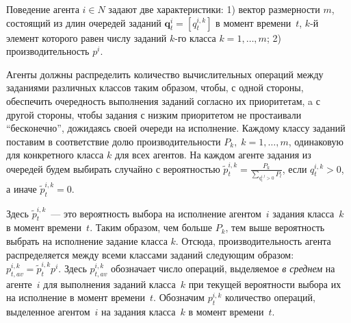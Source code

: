 \documentclass{spisok-article}
\begin{document}
Поведение агента $i \in N$ задают две характеристики:
1) вектор размерности $m$, состоящий из длин очередей заданий $\mathbf q_{t}^{i} = [q^{i, k}_t] $ в момент времени~$t$,  $k$-й элемент которого равен числу заданий $k$-го класса $k=1, \ldots, m$;
2) производительность $p^{i}$.

Агенты должны распределить количество вычислительных операций между заданиями различных классов таким образом, чтобы, с одной стороны, обеспечить очередность выполнения заданий согласно их приоритетам, a с другой стороны, чтобы задания с низким приоритетом  не простаивали ``бесконечно'', дожидаясь своей очереди на исполнение.
Каждому классу заданий поставим в соответствие долю производительности $P_k, \; k = 1, \ldots, m $, одинаковую для конкретного класса $k$ для всех агентов. На каждом агенте задания из очередей будем выбирать случайно с вероятностью $
\tilde p_t^{i, k} = \frac{P_k}{\sum_{q_t^{i, l} > 0} P_l}$, если $q_t^{i, k}>0$, а иначе $ \tilde p_t^{i, k} = 0$. 

Здесь $\tilde p_t^{i, k}$~--- это вероятность выбора на исполнение агентом~$i$ задания класса~$k$ в момент времени~$t$. Таким образом, чем больше $P_k$, тем выше вероятность выбрать на исполнение задание класса $k$. Отсюда, производительность агента распределяется между всеми классами заданий следующим образом:
$
p_{t, av}^{i, k} = \tilde p_t^{i, k}  p^i.
$
Здесь $p_{t, av}^{i, k}$ обозначает число операций, выделяемое \textit{в среднем} на агенте~$i$ для выполнения заданий класса~$k$ при текущей вероятности выбора их на исполнение в момент времени~$t$. Обозначим $p_t^{i, k}$ количество операций, выделенное агентом~$i$ на задания класса~$k$ в момент времени~$t$. %
\end{document}
